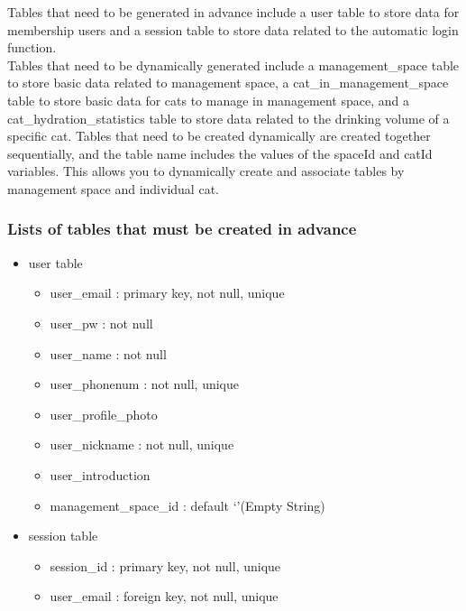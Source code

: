 \documentclass[conference]{IEEEtran}
\begin{document}
Tables that need to be generated in advance include a user table to store data for membership users and a session table to store data related to the automatic login function. \\

Tables that need to be dynamically generated include a management\_space table to store basic data related to management space, a cat\_in\_management\_space table to store basic data for cats to manage in management space, and a cat\_hydration\_statistics table to store data related to the drinking volume of a specific cat. Tables that need to be created dynamically are created together sequentially, and the table name includes the values of the spaceId and catId variables. This allows you to dynamically create and associate tables by management space and individual cat. \\

\subsubsection{Lists of tables that must be created in advance}
\begin{itemize}
    \item user table
    \begin{itemize}
        \item user\_email : primary key, not null, unique
        \item user\_pw : not null
        \item user\_name : not null
        \item user\_phonenum : not null, unique
        \item user\_profile\_photo
        \item user\_nickname : not null, unique
        \item user\_introduction
        \item management\_space\_id : default ‘’(Empty String)
    \end{itemize}
    \item session table
    \begin{itemize}
        \item session\_id : primary key, not null, unique
        \item user\_email : foreign key, not null, unique\\
    \end{itemize}
\end{itemize}
\end{document}
